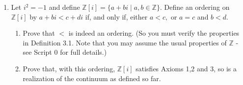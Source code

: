 \documentclass[11pt]{article}
\newcommand{\bbZ}{\mathbb{Z}}
\renewcommand{\_}[1]{\underline{ #1 }}
\theoremstyle{definition}
\numberwithin{equation}{subsection}
\begin{document}
\begin{enumerate}
\item Let $i^2=-1$ and define $\bbZ [i]=\{a+bi\mid a,b\in\bbZ\}.$ Define an ordering on $\bbZ[i]$ by $a+bi<c+di$ if, and only if,
either $a<c,$ or $a=c$ and $b<d.$
\begin{enumerate}
\item Prove that $<$ is indeed an ordering. (So you must verify the properties in Definition 3.1. Note that you may assume the usual properties of $\bbZ$ - see Script 0 for full details.)
\item Prove that, with this ordering, $\bbZ[i]$ satisfies Axioms 1,2 and 3, so is a realization of the continuum as defined so far. 



\end{enumerate}




\end{enumerate}
\end{document}

